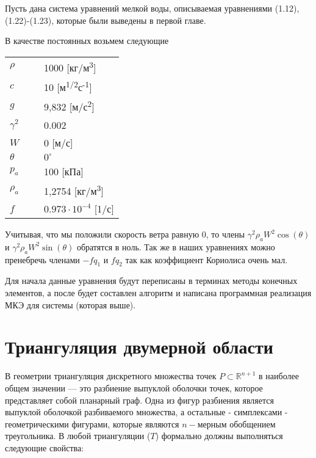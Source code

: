 \documentclass[14pt]{extreport}
\begin{document}
Пусть дана система уравнений мелкой воды, описываемая уравнениями (1.12), (1.22)-(1.23), которые были выведены в первой главе.


В качестве постоянных возьмем следующие

\begin{threeparttable}
\begin{longtable}[H]{lp{0.7\linewidth}}
$\rho$ & 1000 [кг/м\textsuperscript3] \\
$c$ & 10 [м\textsuperscript{1/2}с\textsuperscript{-1}] \\
$g$ & 9,832 [м/с\textsuperscript{2}] \\
$\gamma^2$ & 0.002 \\
$W$ & 0 [м/с] \\
$\theta$ & $0^{\circ}$ \\
$p_a$ & 100 [кПа] \\
$\rho_a$ & 1,2754 [кг/м\textsuperscript3] \\
$f$ & $0.973 \cdot 10^{-4}$ [1/с]
\end{longtable} 
\end{threeparttable}

Учитывая, что мы положили скорость ветра равную $0$, то члены $
\gamma^2\rho_aW^2\cos(\theta)$ и $
\gamma^2\rho_aW^2\sin(\theta)$ обратятся в ноль. Так же в наших уравнениях можно пренебречь членами $-fq_{1}$ и $fq_2$ так как коэффициент Кориолиса очень мал. 










Для начала данные уравнения будут переписаны в терминах методы конечных элементов, а после будет составлен алгоритм и написана программная реализация МКЭ для системы (которая выше).




\chapter{Триангуляция двумерной области}

В геометрии триангуляция дискретного множества точек $P\subset {\mathbb  {R}}^{{n+1}}$ в наиболее общем значении — это разбиение  выпуклой оболочки точек, которое представляет собой планарный граф. Одна из фигур разбиения является выпуклой оболочкой разбиваемого множества, а остальные - симплексами -  геометрическими фигурами, которые являются $n-$мерным обобщением треугольника. В любой триангуляции ($T$) формально должны выполняться следующие свойства:
\end{document}
